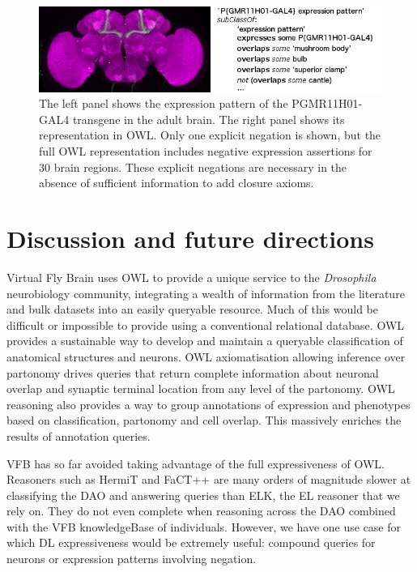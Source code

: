 \documentclass[runningheads,a4paper]{llncs}
\begin{document}
\begin{figure}
\centering
\includegraphics[width=120mm]{images/expression_pattern_with_neg.png}
\caption{The left panel shows the expression pattern of the
  P{GMR11H01-GAL4} transgene in the adult brain.  The right panel
  shows its representation in OWL. Only one explicit negation is shown,
  but the full OWL representation includes negative expression
  assertions for 30 brain regions.  These explicit negations are
  necessary in the absence of sufficient information to add closure axioms.}
\label{fig:exp_pat_neg}
\end{figure}

\section{Discussion and future directions}


Virtual Fly Brain uses OWL to provide a unique service to the
\textit{Drosophila} neurobiology community, integrating a wealth of
information from the literature and bulk datasets into an easily
queryable resource.  Much of this would be difficult or impossible to
provide using a conventional relational database. OWL
provides a sustainable way to develop and maintain a queryable
classification of anatomical structures and neurons.  OWL
axiomatisation allowing inference over partonomy drives queries that
 return complete information about neuronal overlap and synaptic
 terminal location from any level of the partonomy.  OWL reasoning
 also provides a way to group annotations of expression and phenotypes
 based on classification, partonomy and cell overlap.  This massively
 enriches the results of annotation queries.


VFB has so far avoided taking advantage of the full expressiveness of
OWL.  Reasoners such as HermiT\cite{HermiT2008} and FaCT++ \cite{Fact2006}  are many orders of
magnitude slower at classifying the DAO and answering queries than
ELK, the EL reasoner that we rely on.  They do not even complete when
reasoning across the DAO combined with the VFB knowledgeBase of
individuals.  However, we have one use case for which DL
expressiveness would be extremely useful: compound queries for neurons
or expression patterns involving negation.
\end{document}

